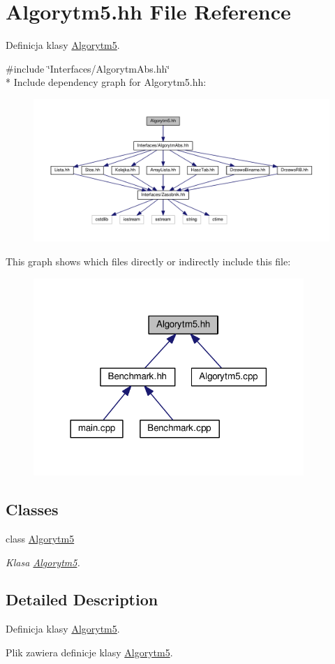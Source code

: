 \hypertarget{a00029}{}\section{Algorytm5.\+hh File Reference}
\label{a00029}


Definicja klasy \hyperlink{a00006}{Algorytm5}.  


{\ttfamily \#include \char`\"{}Interfaces/\+Algorytm\+Abs.\+hh\char`\"{}}\\*
Include dependency graph for Algorytm5.\+hh\+:
\nopagebreak
\begin{figure}[H]
\begin{center}
\leavevmode
\includegraphics[width=350pt]{a00073}
\end{center}
\end{figure}
This graph shows which files directly or indirectly include this file\+:
\nopagebreak
\begin{figure}[H]
\begin{center}
\leavevmode
\includegraphics[width=290pt]{a00074}
\end{center}
\end{figure}
\subsection*{Classes}
\begin{DoxyCompactItemize}
\item 
class \hyperlink{a00006}{Algorytm5}
\begin{DoxyCompactList}\small\item\em Klasa \hyperlink{a00006}{Algorytm5}. \end{DoxyCompactList}\end{DoxyCompactItemize}


\subsection{Detailed Description}
Definicja klasy \hyperlink{a00006}{Algorytm5}. 

Plik zawiera definicje klasy \hyperlink{a00006}{Algorytm5}. 